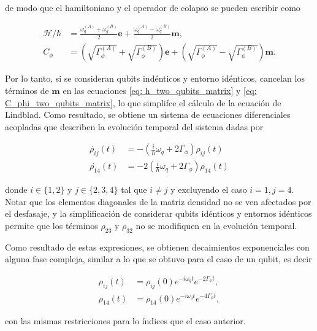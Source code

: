\noindent de modo que el hamiltoniano y el operador de colapso se pueden escribir como

\begin{align}
    \mathcal{H}/\hbar &= \frac{\omega_q^{(A)}+\omega_q^{(B)}}{2} \mathbf{e} + \frac{\omega_q^{(A)}-\omega_q^{(B)}}{2} \mathbf{m}, \label{eq: h_two_qubits_matrix} \\
    C_\phi &= \left(\sqrt{\Gamma_\phi^{(A)}} + \sqrt{\Gamma_\phi^{(B)}}\right) \mathbf{e} + \left(\sqrt{\Gamma_\phi^{(A)}} - \sqrt{\Gamma_\phi^{(B)}}\right) \mathbf{m}. \label{eq: C_phi_two_qubits_matrix}
\end{align}

Por lo tanto, si se consideran qubits indénticos y entorno idénticos, cancelan los términos de \(\mathbf{m}\) en las ecuaciones \ref{eq: h_two_qubits_matrix} y \ref{eq: C_phi_two_qubits_matrix}, lo que simplifce el cálculo de la ecuación de Lindblad. Como resultado, se obtiene un sistema de ecuaciones diferenciales acopladas que describen la evolución temporal del sistema dadas por

\begin{align}
    \dot{\rho_{ij}}(t) &= - \left(\frac{i}{\hbar} \omega_q + 2 \Gamma_\phi\right) \rho_{ij}(t) \nonumber \\
    \dot{\rho_{14}}(t) &= -2 \left(\frac{i}{\hbar} \omega_q + 2 \Gamma_\phi\right) \rho_{14}(t) \nonumber 
\end{align}

\noindent donde \(i \in \{1, 2\} \) y \(j \in \{2, 3, 4\}\) tal que \(i\neq j\) y excluyendo el caso \(i = 1, j = 4\). Notar que los elementos diagonales de la matriz densidad no se ven afectados por el desfasaje, y la simplificación de considerar qubits idénticos y entornos idénticos permite que los términos \(\rho_{23}\) y \(\rho_{32}\) no se modifiquen en la evolución temporal.

Como resultado de estas expresiones, se obtienen decaimientos exponenciales con alguna fase compleja, similar a lo que se obtuvo para el caso de un qubit, es decir

\begin{align}
    \rho_{ij}(t) &= \rho_{ij}(0) e^{-i \omega_q t} e^{-2\Gamma_\phi t} \label{sol: pij}, \\
    \rho_{14}(t) &= \rho_{14}(0) e^{-i \omega_q t} e^{-4\Gamma_\phi t} \label{eq: sol_p14},
\end{align}

\noindent con las mismas restricciones para lo índices que el caso anterior.

